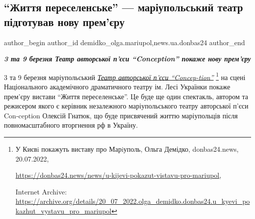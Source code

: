  
 
 
 
 
 
\subsection{\enquote{Життя переселенське} — маріупольський театр підготував нову прем'єру}
\label{sec:28_02_2023.stz.news.ua.donbas24.1.zhyttja_pereselenske_premjera}
 
\ifcmt
 author_begin
   author_id demidko_olga.mariupol,news.ua.donbas24
 author_end
\fi


\begin{center}
  \em\bfseries\Large
3 та 9 березня Театр авторської п'єси \enquote{Conception} покаже нову прем'єру 
\end{center}

3 та 9 березня маріупольський
\href{https://archive.org/details/20_07_2022.olga_demidko.donbas24.u_kyevi_pokazhut_vystavu_pro_mariupol}{%
\emph{Театр авторської п'єси \enquote{Concep\hyp{}tion}}}%
\footnote{У Києвi покажуть виставу про Марiуполь, Ольга Демідко, donbas24.news, 20.07.2022, \par%
\url{https://donbas24.news/news/u-kijevi-pokazut-vistavu-pro-mariupol}, \par%
Internet Archive: \url{https://archive.org/details/20_07_2022.olga_demidko.donbas24.u_kyevi_pokazhut_vystavu_pro_mariupol}%
} %
на сцені Національного академічного драматичного театру ім. Лесі Українки
покаже прем'єру вистави \enquote{Життя переселенське}. Це буде ще один
спектакль, автором та режисером якого є керівник незалежного маріупольського
театру авторської п'єси Con\hyp{}ception Олексій Гнатюк, що буде присвячений життю
маріупольців після повномасштабного вторгнення рф в Україну.

